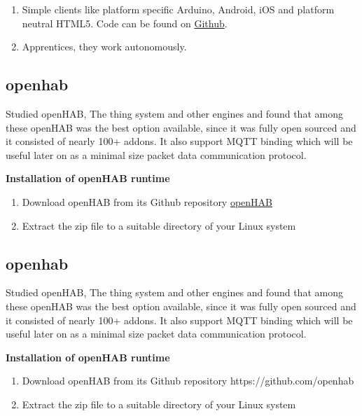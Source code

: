 \documentclass[16pt]{article}
\begin{document}
\begin{enumerate}


\item
  Simple clients like platform specific Arduino, Android, iOS and
  platform neutral HTML5. Code can be found on
  \href{https://github.com/TheThingSystem/steward/tree/master/clients/examples}{Github}.
\item
  Apprentices, they work autonomously.
  
\end{enumerate}

\subsection{openhab}


Studied openHAB, The thing system and other engines and found that among these openHAB was the best option available, since it was fully open sourced and it
consisted of nearly 100+ addons. It also support MQTT binding which will be useful later on as a minimal size packet data communication protocol.

\hfill

\textbf{Installation of openHAB runtime}

\begin{enumerate}

  \item Download openHAB from its Github repository \href{https://github.com/openhab}{openHAB}
  \item Extract the zip file to a suitable directory of your Linux system

\end{enumerate}


\subsection{openhab}


Studied openHAB, The thing system and other engines and found that among these openHAB was the best option available, since it was fully open sourced and it
consisted of nearly 100+ addons. It also support MQTT binding which will be useful later on as a minimal size packet data communication protocol.

\hfill

\textbf{Installation of openHAB runtime}

\begin{enumerate}

  \item Download openHAB from its Github repository https://github.com/openhab
  \item Extract the zip file to a suitable directory of your Linux system

\end{enumerate}
\end{document}
